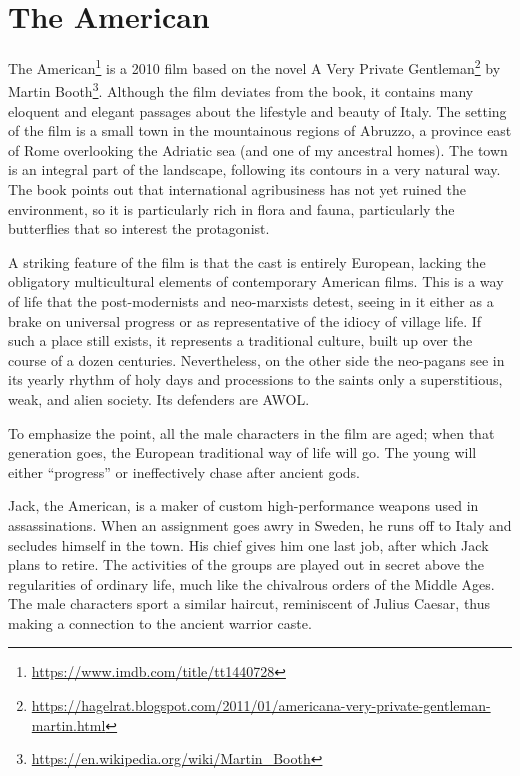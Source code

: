 \section{The American}

The American\footnote{\url{https://www.imdb.com/title/tt1440728}} is a 2010 film based on the novel A Very Private Gentleman\footnote{\url{https://hagelrat.blogspot.com/2011/01/americana-very-private-gentleman-martin.html}} by Martin Booth\footnote{\url{https://en.wikipedia.org/wiki/Martin\_Booth}}. Although the film deviates from the book, it contains many eloquent and elegant passages about the lifestyle and beauty of Italy. The setting of the film is a small town in the mountainous regions of Abruzzo, a province east of Rome overlooking the Adriatic sea (and one of my ancestral homes). The town is an integral part of the landscape, following its contours in a very natural way. The book points out that international agribusiness has not yet ruined the environment, so it is particularly rich in flora and fauna, particularly the butterflies that so interest the protagonist.

A striking feature of the film is that the cast is entirely European, lacking the obligatory multicultural elements of contemporary American films. This is a way of life that the post-modernists and neo-marxists detest, seeing in it either as a brake on universal progress or as representative of the idiocy of village life. If such a place still exists, it represents a traditional culture, built up over the course of a dozen centuries. Nevertheless, on the other side the neo-pagans see in its yearly rhythm of holy days and processions to the saints only a superstitious, weak, and alien society. Its defenders are AWOL.

To emphasize the point, all the male characters in the film are aged; when that generation goes, the European traditional way of life will go. The young will either ``progress'' or ineffectively chase after ancient gods.

Jack, the American, is a maker of custom high-performance weapons used in assassinations. When an assignment goes awry in Sweden, he runs off to Italy and secludes himself in the town. His chief gives him one last job, after which Jack plans to retire. The activities of the groups are played out in secret above the regularities of ordinary life, much like the chivalrous orders of the Middle Ages. The male characters sport a similar haircut, reminiscent of Julius Caesar, thus making a connection to the ancient warrior caste.


